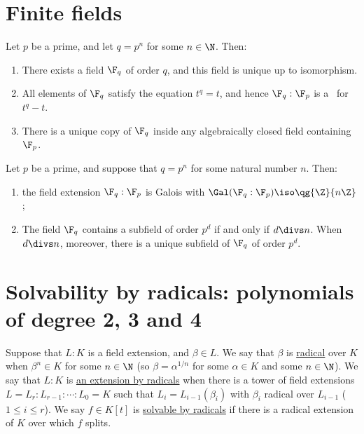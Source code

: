 \documentclass{article}
\begin{document}
\section{Finite fields}
  \begin{ttheorem}
    Let \( p \) be a prime, and let \( q=p^n \) for some \( n\in \N \).
    Then: \begin{enumerate}[label=(\alph*)]
      \item There exists a field \( \F_q \) of order \( q \), and this field is unique up to isomorphism.
      \item All elements of \( \F_q \) satisfy the equation \( t^q=t \), and hence \( \F_q:\F_p \) is a \sfe~for \( t^q-t \).
      \item There is a unique copy of \( \F_q \) inside any algebraically closed field containing \( \F_p \).
    \end{enumerate}
  \end{ttheorem}

  \begin{ttheorem}
    Let \( p \) be a prime, and suppose that \( q=p^n \) for some natural number \( n \).
    Then: \begin{enumerate}[label=(\alph*)]
      \item the field extension \( \F_q:\F_p \) is Galois with \( \Gal(\F_q:\F_p)\iso \qg{\Z}{n\Z} \);
      \item The field \( \F_q \) contains a subfield of order \( p^d \) if and only if \( d\divs n \).
        When \( d\divs n \), moreover, there is a unique subfield of \( \F_q \) of order \( p^d \).
    \end{enumerate}
  \end{ttheorem}

\section{Solvability by radicals: polynomials of degree 2, 3 and 4}
  \begin{tdefinition}
    Suppose that \( L:K \) is a field extension, and \( \beta\in L \).
    We say that \( \beta \) is \ul{radical} over \( K \) when \( \beta^n\in K \) for some \( n\in \N \) (so \( \beta=\alpha^{1/n} \) for some \( \alpha\in K \) and some \( n\in\N \)).
    We say that \( L:K \) is \ul{an extension by radicals} when there is a tower of field extensions \( L=L_r:L_{r-1}:\cdots:L_0=K \) such that \( L_i=L_{i-1}(\beta_i) \) with \( \beta_i \) radical over \( L_{i-1} \) (\( 1\leq i\leq r \)).
    We say \( f\in K[t] \) is \ul{solvable by radicals} if there is a radical extension of \( K \) over which \( f \) splits.
  \end{tdefinition}
\end{document}
